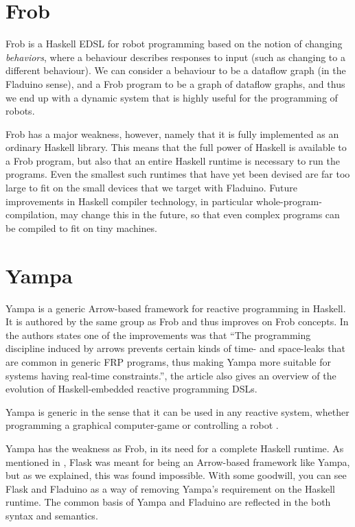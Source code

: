 \documentclass[a4paper, oneside, final]{memoir}
\let\Fref\undefined
\begin{document}
\section{Frob}

Frob \cite{frob99} is a Haskell EDSL for robot programming based on the
notion of changing \textit{behaviors}, where a behaviour describes
responses to input (such as changing to a different behaviour).  We
can consider a behaviour to be a dataflow graph (in the Fladuino
sense), and a Frob program to be a graph of dataflow graphs, and thus
we end up with a dynamic system that is highly useful for the
programming of robots.

Frob has a major weakness, however, namely that it is fully
implemented as an ordinary Haskell library.  This means that the full
power of Haskell is available to a Frob program, but also that an
entire Haskell runtime is necessary to run the programs.  Even the
smallest such runtimes that have yet been devised are far too large to
fit on the small devices that we target with Fladuino.  Future
improvements in Haskell compiler technology, in particular
whole-program-compilation, may change this in the future, so that even
complex programs can be compiled to fit on tiny machines.

\section{Yampa}
Yampa is a generic Arrow-based framework for reactive programming in
Haskell. It is authored by the same group as Frob and thus improves on
Frob concepts. In \cite{arrowsrobotsfrp02} the authors states one of
the improvements was that ``The programming discipline induced by
arrows prevents certain kinds of time- and space-leaks that are common
in generic FRP programs, thus making Yampa more suitable for systems
having real-time constraints.'', the article also gives an overview of
the evolution of Haskell-embedded reactive programming DSLs. 

Yampa is generic in the sense that it can be used in any reactive
system, whether programming a graphical computer-game
\cite{Courtney2003b} or controlling a robot \cite{arrowsrobotsfrp02}.

Yampa has the weakness as Frob, in its need for a complete Haskell
runtime. As mentioned in \Fref[plain]{chap:Flask}, Flask was meant for
being an Arrow-based framework like Yampa, but as we explained, this
was found impossible. With some goodwill, you can see Flask and
Fladuino as a way of removing Yampa's requirement on the Haskell
runtime.  The common basis of Yampa and Fladuino are reflected in the
both syntax and semantics. 
\end{document}
